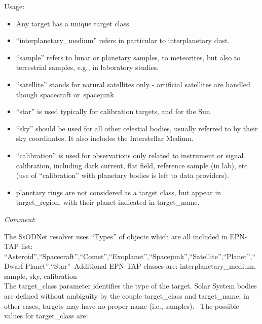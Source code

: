 \documentclass[11pt,a4paper]{ivoa}
\begin{document}
Usage:

\begin{itemize}
\item Any target has a unique target class.
\item ``interplanetary\_medium'' refers in particular to interplanetary dust.
\item ``sample'' refers to lunar or planetary samples, to meteorites, but also to terrestrial samples, e.g., in laboratory studies.
\item ``satellite'' stands for natural satellites only - artificial satellites are handled though spacecraft or spacejunk.
\item ``star'' is used typically for calibration targets, and for the Sun.
\item ``sky'' should be used for all other celestial bodies, usually referred to by their sky coordinates. It also includes the Interstellar Medium.
\item ``calibration'' is used for observations only related to instrument or signal calibration, including dark current, flat field, reference sample (in lab), etc (use of ``calibration'' with planetary bodies is left to data providers).
\item planetary rings are not considered as a target class, but appear in target\_region, with their planet indicated in target\_name.
\end{itemize}

\emph{Comment}: 

The SsODNet resolver uses ``Types'' of objects which are all included in EPN-TAP list: ``Asteroid'',``Spacecraft'',``Comet'',``Exoplanet'',``Spacejunk'',``Satellite'',``Planet'',``Dwarf Planet'',``Star'' Additional EPN-TAP classes are: interplanetary\_medium, sample, sky, calibration \\

The target\_class parameter identifies the type of the target. Solar System bodies are defined without ambiguity by the couple target\_class and target\_name; in other cases, targets may have no proper name (i.e., samples).  The possible values for target\_class are:
\end{document}
